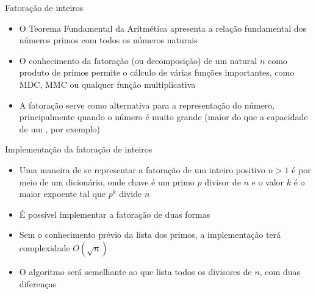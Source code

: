 \begin{frame}[fragile]{Fatoração de inteiros}

    \begin{itemize}
        \item O Teorema Fundamental da Aritmética apresenta a relação fundamental dos números
            primos com todos os números naturais

        \item O conhecimento da fatoração (ou decomposição) de um natural $n$ como produto de
            primos permite o cálculo de várias funções importantes, como MDC, MMC ou qualquer 
            função multiplicativa

        \item A fatoração serve como alternativa para a representação do número, principalmente
            quando o número é muito grande (maior do que a capacidade de um ,
            por exemplo)
    \end{itemize}

\end{frame}

\begin{frame}[fragile]{Implementação da fatoração de inteiros}

    \begin{itemize}
        \item Uma maneira de se representar a fatoração de um inteiro positivo $n > 1$ é por meio
            de um dicionário, onde chave é um primo $p$ divisor de $n$ e o valor $k$ é o maior
            expoente tal que $p^k$ divide $n$

        \item É possível implementar a fatoração de duas formas

        \item Sem o conhecimento prévio da lista dos primos, a implementação terá complexidade
            $O(\sqrt{n})$

        \item O algoritmo será semelhante ao que lista todos os divisores de $n$, com duas
            diferenças
    \end{itemize}

\end{frame}

